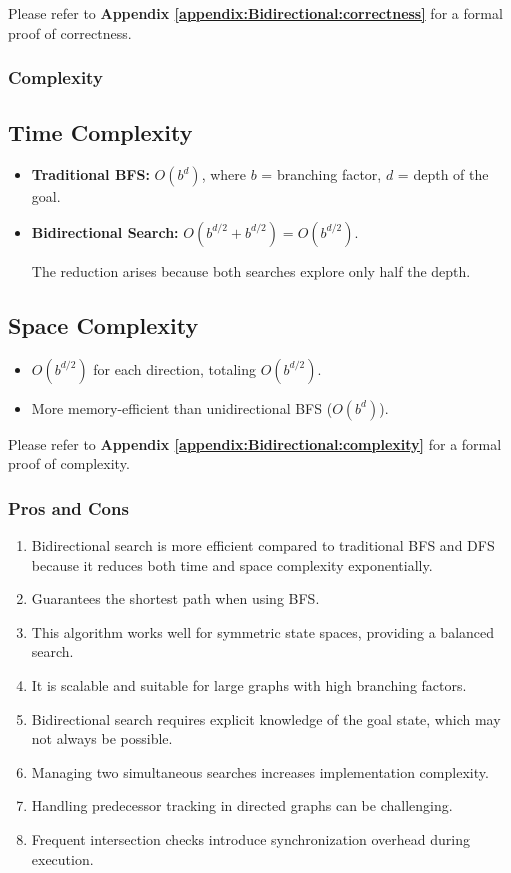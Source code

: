 		Please refer to \textbf{ Appendix \ref{appendix:Bidirectional:correctness}} for a formal proof of correctness.
		
		\subsubsection{Complexity}
		
		\subsection*{Time Complexity}
		\begin{itemize}
			\item \textbf{Traditional BFS:} $O(b^d)$, where $b$ = branching factor, $d$ = depth of the goal.
			\item \textbf{Bidirectional Search:} $O(b^{d/2} + b^{d/2}) = O(b^{d/2})$.
			
			The reduction arises because both searches explore only half the depth.
		\end{itemize}
		
		\subsection*{Space Complexity}
		\begin{itemize}
			\item $O(b^{d/2})$ for each direction, totaling $O(b^{d/2})$. 
			\item More memory-efficient than unidirectional BFS ($O(b^d)$).
			
		\end{itemize}
	    Please refer to \textbf{ Appendix \ref{appendix:Bidirectional:complexity}} for a formal proof of complexity.
	    
	
		\subsubsection{Pros and Cons}
		\begin{enumerate}
			\item Bidirectional search is more efficient compared to traditional BFS and DFS because it reduces both time and space complexity exponentially.
			\item Guarantees the shortest path when using BFS.
			\item This algorithm works well for symmetric state spaces, providing a balanced search.
			\item It is scalable and suitable for large graphs with high branching factors.\\
			
			
			\item Bidirectional search requires explicit knowledge of the goal state, which may not always be possible.
			\item Managing two simultaneous searches increases implementation complexity.
			\item Handling predecessor tracking in directed graphs can be challenging.
			\item Frequent intersection checks introduce synchronization overhead during execution.
		\end{enumerate}
